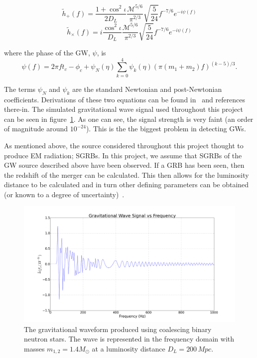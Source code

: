 \documentclass[12pt]{iopart}
\newcommand{\gws}{\tilde{h}}
\begin{document}
\begin{equation}
  \gws_{+}(f) = \frac{1+\cos^{2}\iota}{2D_{L}}
\frac{\mathcal{M}^{5/6}}{\pi^{2/3}} \sqrt{\frac{5}{24}}f^{-7/6}e^{-i\psi(f)}
\end{equation}
\begin{equation}
  \gws_{\times}(f) =
i\frac{\cos^{2}\iota}{D_{L}}\frac{\mathcal{M}^{5/6}}{\pi^{2/3}}
\sqrt{\frac{5}{24}}f^{-7/6}e^{-i\psi(f)}
\end{equation}

where the phase of the GW, $\psi$, is
\begin{equation}
  \label{eq:psi}
  \psi(f) = 2\pi f t_c - \phi_c + \psi_N(\eta)\sum\limits_{k=0}^4{\psi_k(\eta)
(\pi(m_1 + m_2)f)^{(k-5)/3}}.
\end{equation}

The terms $\psi_N$ and $\psi_k$ are the standard Newtonian and post-Newtonian
coefficients. Derivations of these two equations can be found in~\cite{pN} and
references there-in. The simulated gravitational wave signal used throughout
this project can be seen in figure~\ref{fig:signal}. As one can see, the signal
strength is very faint (an order of magnitude around $10^{-24}$). This is the
the biggest problem in detecting GWs.

As mentioned above, the source considered throughout this project thought to
produce EM radiation; SGRBs. In this project, we assume that SGRBs of the GW
source described above have been observed. If a GRB has been seen, then the
redshift of the merger can be calculated. This then allows for the luminosity
distance to be calculated and in turn other defining parameters can be obtained
(or known to a degree of uncertainty)~\cite{SathSchutz}.

\begin{figure}
  \centering
  \includegraphics[width=\textwidth]{grav_signal}
  \caption{The gravitational waveform produced using coalescing binary
neutron stars. The wave is represented in the frequency domain with masses
$m_{1,2} = 1.4M_{\odot}$ at a luminosity distance $D_{L} = 200 \,Mpc$.}
  \label{fig:signal}
\end{figure}
\end{document}
